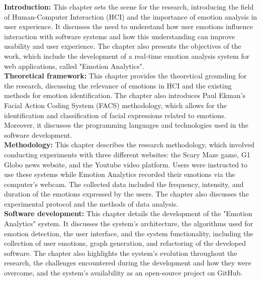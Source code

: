 \begin{resumo-ingles}

  \textbf{Introduction:} This chapter sets the scene for the research, introducing the field of Human-Computer Interaction (HCI) and the importance of emotion analysis in user experience. It discusses the need to understand how user emotions influence interaction with software systems and how this understanding can improve usability and user experience. The chapter also presents the objectives of the work, which include the development of a real-time emotion analysis system for web applications, called "Emotion Analytics".
  \\

  \textbf{Theoretical framework:} This chapter provides the theoretical grounding for the research, discussing the relevance of emotions in HCI and the existing methods for emotion identification. The chapter also introduces Paul Ekman's Facial Action Coding System (FACS) methodology, which allows for the identification and classification of facial expressions related to emotions. Moreover, it discusses the programming languages and technologies used in the software development.
  \\

  \textbf{Methodology:} This chapter describes the research methodology, which involved conducting experiments with three different websites: the Scary Maze game, G1 Globo news website, and the Youtube video platform. Users were instructed to use these systems while Emotion Analytics recorded their emotions via the computer's webcam. The collected data included the frequency, intensity, and duration of the emotions expressed by the users. The chapter also discusses the experimental protocol and the methods of data analysis.
  \\

  \textbf{Software development:} This chapter details the development of the "Emotion Analytics" system. It discusses the system's architecture, the algorithms used for emotion detection, the user interface, and the system functionality, including the collection of user emotions, graph generation, and refactoring of the developed software. The chapter also highlights the system's evolution throughout the research, the challenges encountered during the development and how they were overcome, and the system's availability as an open-source project on GitHub.
  \pagebreak


\end{resumo-ingles}
